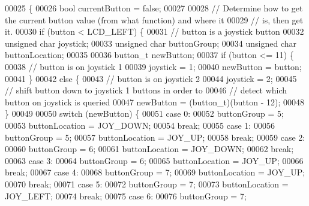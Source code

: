 \begin{DoxyCode}
00025                                      \{
00026     \textcolor{keywordtype}{bool} currentButton = \textcolor{keyword}{false};
00027 
00028     \textcolor{comment}{// Determine how to get the current button value (from what function) and where it}
00029     \textcolor{comment}{// is, then get it.}
00030     \textcolor{keywordflow}{if} (button < LCD_LEFT) \{
00031         \textcolor{comment}{// button is a joystick button}
00032         \textcolor{keywordtype}{unsigned} \textcolor{keywordtype}{char} joystick;
00033         \textcolor{keywordtype}{unsigned} \textcolor{keywordtype}{char} buttonGroup;
00034         \textcolor{keywordtype}{unsigned} \textcolor{keywordtype}{char} buttonLocation;
00035 
00036         button_t newButton;
00037         \textcolor{keywordflow}{if} (button <= 11) \{
00038             \textcolor{comment}{// button is on joystick 1}
00039             joystick = 1;
00040             newButton = button;
00041         \}
00042         \textcolor{keywordflow}{else} \{
00043             \textcolor{comment}{// button is on joystick 2}
00044             joystick = 2;
00045             \textcolor{comment}{// shift button down to joystick 1 buttons in order to}
00046             \textcolor{comment}{// detect which button on joystick is queried}
00047             newButton = (button_t)(button - 12);
00048         \}
00049 
00050         \textcolor{keywordflow}{switch} (newButton) \{
00051         \textcolor{keywordflow}{case} 0:
00052             buttonGroup = 5;
00053             buttonLocation = JOY\_DOWN;
00054             \textcolor{keywordflow}{break};
00055         \textcolor{keywordflow}{case} 1:
00056             buttonGroup = 5;
00057             buttonLocation = JOY\_UP;
00058             \textcolor{keywordflow}{break};
00059         \textcolor{keywordflow}{case} 2:
00060             buttonGroup = 6;
00061             buttonLocation = JOY\_DOWN;
00062             \textcolor{keywordflow}{break};
00063         \textcolor{keywordflow}{case} 3:
00064             buttonGroup = 6;
00065             buttonLocation = JOY\_UP;
00066             \textcolor{keywordflow}{break};
00067         \textcolor{keywordflow}{case} 4:
00068             buttonGroup = 7;
00069             buttonLocation = JOY\_UP;
00070             \textcolor{keywordflow}{break};
00071         \textcolor{keywordflow}{case} 5:
00072             buttonGroup = 7;
00073             buttonLocation = JOY\_LEFT;
00074             \textcolor{keywordflow}{break};
00075         \textcolor{keywordflow}{case} 6:
00076             buttonGroup = 7;

\end{DoxyCode}
